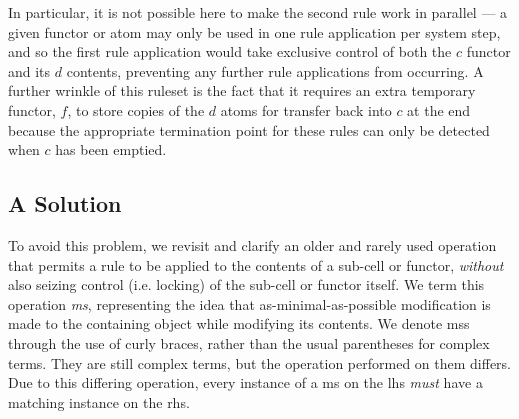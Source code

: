In particular, it is not possible here to make the second rule work in parallel --- a given functor or atom may only be used in one rule application per system step, and so the first rule application would take exclusive control of both the \(c\) functor and its \(d\) contents, preventing any further rule applications from occurring.  A further wrinkle of this ruleset is the fact that it requires an extra temporary functor, \(f\), to store copies of the \(d\) atoms for transfer back into \(c\) at the end because the appropriate termination point for these rules can only be detected when \(c\) has been emptied.

\subsection{A Solution}
To avoid this problem, we revisit and clarify an older and rarely used operation that permits a rule to be applied to the contents of a sub-cell or functor, \emph{without} also seizing control (i.e. locking) of the sub-cell or functor itself.  We term this operation \emph{\gls{ms}}, representing the idea that as-minimal-as-possible modification is made to the containing object while modifying its contents.  We denote \glspl{ms} through the use of curly braces, rather than the usual parentheses for complex terms.  They are still complex terms, but the operation performed on them differs.  Due to this differing operation, every instance of a \gls{ms} on the \gls{lhs} \emph{must} have a matching instance on the \gls{rhs}.




\begin{cprulesetfloat}
    \begin{cpruleset}

    \end{cpruleset}
    \caption{\label{rules:cps:microsurg}Rules for a destructive multiplication process that requires exactly two steps regardless of the numbers multiplied by using \gls{cps} \glspl{ms}}
\end{cprulesetfloat}

